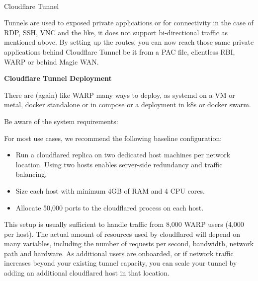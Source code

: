 \documentclass[
]{article}
\makeatletter
\let\oldparagraph\paragraph
\renewcommand{\paragraph}{
    \@ifstar
      \xxxParagraphStar
      \xxxParagraphNoStar
  }
\newcommand{\xxxParagraphStar}[1]{\oldparagraph*{#1}\mbox{}}
\newcommand{\xxxParagraphNoStar}[1]{\oldparagraph{#1}\mbox{}}
\providecommand{\tightlist}{%
  \setlength{\itemsep}{0pt}\setlength{\parskip}{0pt}}\usepackage{longtable,booktabs,array}
\makeatother
\begin{document}
\newpage{}

\paragraph{Cloudflare Tunnel}\label{cloudflare-tunnel}

Tunnels are used to exposed private applications or for connectivity in
the case of RDP, SSH, VNC and the like, it does not support
bi-directional traffic as mentioned above. By setting up the routes, you
can now reach those same private applications behind Cloudflare Tunnel
be it from a PAC file, clientless RBI, WARP or behind Magic WAN.

\begin{tcolorbox}[enhanced jigsaw, title=\textcolor{quarto-callout-note-color}{\faInfo}\hspace{0.5em}{Note}, rightrule=.15mm, bottomtitle=1mm, opacitybacktitle=0.6, titlerule=0mm, colbacktitle=quarto-callout-note-color!10!white, coltitle=black, opacityback=0, left=2mm, toprule=.15mm, breakable, toptitle=1mm, arc=.35mm, colback=white, bottomrule=.15mm, leftrule=.75mm, colframe=quarto-callout-note-color-frame]

\textbf{Cloudflare Tunnel Deployment}

There are (again) like WARP many ways to deploy, as systemd on a VM or
metal, docker standalone or in compose or a deployment in k8s or docker
swarm.

Be aware of the system requirements:

For most use cases, we recommend the following baseline configuration:

\begin{itemize}
\tightlist
\item
  Run a cloudflared replica on two dedicated host machines per network
  location. Using two hosts enables server-side redundancy and traffic
  balancing.
\item
  Size each host with minimum 4GB of RAM and 4 CPU cores.
\item
  Allocate 50,000 ports to the cloudflared process on each host.
\end{itemize}

This setup is usually sufficient to handle traffic from 8,000 WARP users
(4,000 per host). The actual amount of resources used by cloudflared
will depend on many variables, including the number of requests per
second, bandwidth, network path and hardware. As additional users are
onboarded, or if network traffic increases beyond your existing tunnel
capacity, you can scale your tunnel by adding an additional cloudflared
host in that location.

\end{tcolorbox}
\end{document}
